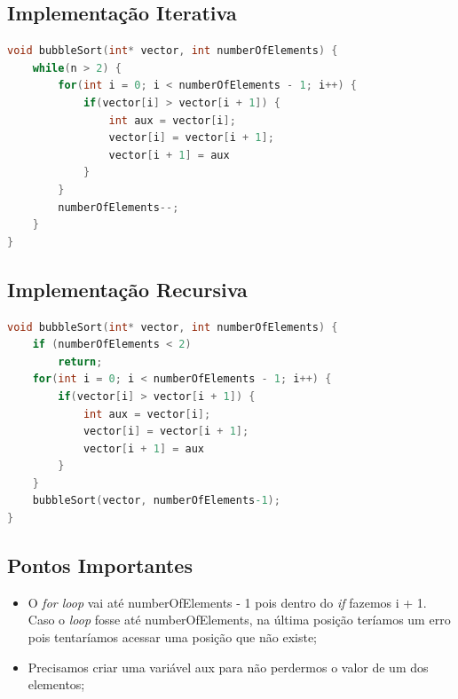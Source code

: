 \subsection{Implementação Iterativa}
\begin{lstlisting}[language=C]
void bubbleSort(int* vector, int numberOfElements) {
    while(n > 2) {
        for(int i = 0; i < numberOfElements - 1; i++) {
            if(vector[i] > vector[i + 1]) {
                int aux = vector[i];
                vector[i] = vector[i + 1];
                vector[i + 1] = aux
            }
        }
        numberOfElements--;
    }
}
\end{lstlisting}

\subsection{Implementação Recursiva}
\begin{lstlisting}[language=C]
void bubbleSort(int* vector, int numberOfElements) {
    if (numberOfElements < 2)
        return;
    for(int i = 0; i < numberOfElements - 1; i++) {
        if(vector[i] > vector[i + 1]) {
            int aux = vector[i];
            vector[i] = vector[i + 1];
            vector[i + 1] = aux
        }
    }
    bubbleSort(vector, numberOfElements-1);
}
\end{lstlisting}

\subsection{Pontos Importantes}
\begin{itemize}
    \item O \textit{for loop} vai até numberOfElements - 1 pois dentro do \textit{if} fazemos i + 1. Caso o \textit{loop} fosse até numberOfElements, na última posição teríamos um erro pois tentaríamos acessar uma posição que não existe; 
    
    \item Precisamos criar uma variável aux para não perdermos o valor de um dos elementos;
\end{itemize}